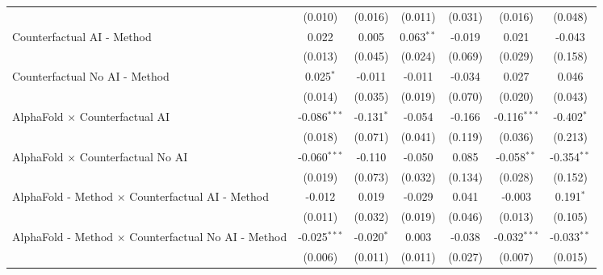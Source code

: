 \begin{tabular}{lcccccc}
                                                              & (0.010)        & (0.016)       & (0.011)       & (0.031)       & (0.016)        & (0.048)\\   
   Counterfactual AI - Method                                 & 0.022          & 0.005         & 0.063$^{**}$  & -0.019        & 0.021          & -0.043\\   
                                                              & (0.013)        & (0.045)       & (0.024)       & (0.069)       & (0.029)        & (0.158)\\   
   Counterfactual No AI - Method                              & 0.025$^{*}$    & -0.011        & -0.011        & -0.034        & 0.027          & 0.046\\   
                                                              & (0.014)        & (0.035)       & (0.019)       & (0.070)       & (0.020)        & (0.043)\\   
   AlphaFold $\times$ Counterfactual AI                       & -0.086$^{***}$ & -0.131$^{*}$  & -0.054        & -0.166        & -0.116$^{***}$ & -0.402$^{*}$\\   
                                                              & (0.018)        & (0.071)       & (0.041)       & (0.119)       & (0.036)        & (0.213)\\   
   AlphaFold $\times$ Counterfactual No AI                    & -0.060$^{***}$ & -0.110        & -0.050        & 0.085         & -0.058$^{**}$  & -0.354$^{**}$\\   
                                                              & (0.019)        & (0.073)       & (0.032)       & (0.134)       & (0.028)        & (0.152)\\   
   AlphaFold - Method $\times$ Counterfactual AI - Method     & -0.012         & 0.019         & -0.029        & 0.041         & -0.003         & 0.191$^{*}$\\   
                                                              & (0.011)        & (0.032)       & (0.019)       & (0.046)       & (0.013)        & (0.105)\\   
   AlphaFold - Method $\times$ Counterfactual No AI - Method  & -0.025$^{***}$ & -0.020$^{*}$  & 0.003         & -0.038        & -0.032$^{***}$ & -0.033$^{**}$\\   
                                                              & (0.006)        & (0.011)       & (0.011)       & (0.027)       & (0.007)        & (0.015)\\   

\end{tabular}
